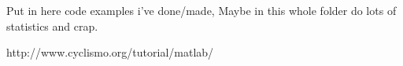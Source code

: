 \documentclass[11pt]{article}
\begin{document}
Put in here code examples i've done/made, Maybe in this whole folder do lots of statistics and crap. 

http://www.cyclismo.org/tutorial/matlab/
\end{document}
